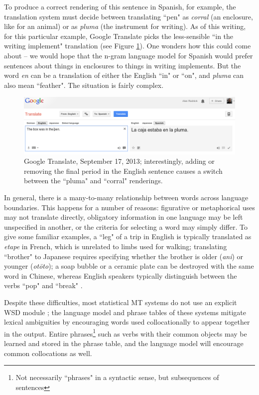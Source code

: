 To produce a correct rendering of this sentence in Spanish, for example, the
translation system must decide between translating ``pen" as \emph{corral} (an
enclosure, like for an animal) or as \emph{pluma} (the instrument for writing).
As of this writing, for this particular example, Google Translate picks the
less-sensible ``in the writing implement" translation (see Figure
\ref{fig:box-in-pen}).
One wonders how this could come about -- we would hope that the n-gram language
model for Spanish would prefer sentences about things in enclosures to things
in writing implements.
But the word \emph{en} can be a translation of either the English ``in" or
``on", and \emph{pluma} can also mean ``feather".
The situation is fairly complex.


\begin{figure}
  \includegraphics[width=12cm]{box-in-pen.png}
  \caption{Google Translate, September 17, 2013; interestingly, adding or
  removing the final period in the English sentence causes a switch between the
  ``pluma" and ``corral" renderings.}
  \label{fig:box-in-pen}
\end{figure}

In general, there is a many-to-many relationship between words across language
boundaries.
This happens for a number of reasons: figurative or metaphorical uses may not
translate directly,
obligatory information in one language may be left unspecified in another,
or the criteria for selecting a word may simply differ.
To give some familiar examples, a ``leg" of a trip in English is typically
translated as \emph{etape} in French, which is unrelated to limbs used for
walking;
translating ``brother" to Japanese requires specifying whether the brother is
older (\emph{ani}) or younger (\emph{ot\=oto});
a soap bubble or a ceramic plate can be destroyed with the same word in
Chinese, whereas English speakers typically distinguish between the verbs
``pop" and ``break" \cite{majid2007semantic}.

Despite these difficulties, most statistical MT systems do not use an explicit
WSD module \cite{wsdchap3}; the language model and phrase tables of these
systems mitigate lexical ambiguities by encouraging words used collocationally
to appear together in the output. Entire phrases\footnote{Not necessarily
``phrases" in a syntactic sense, but subsequences of sentences} such as verbs
with their common objects may be learned and stored in the phrase table, and
the language model will encourage common collocations as well.

